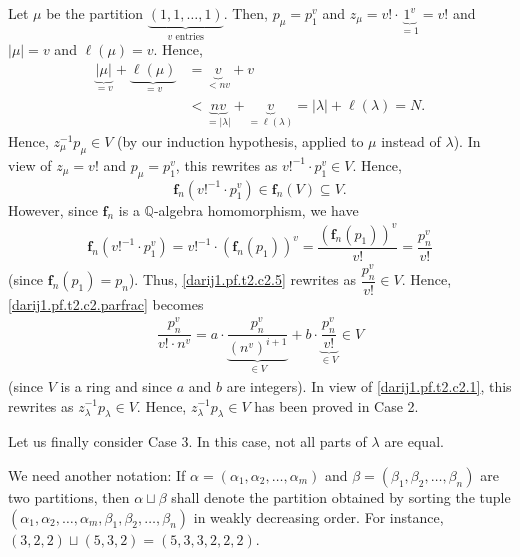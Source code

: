 \documentclass[10pt,a4paper]{article}
\begin{document}
Let $\mu$ be the partition $\underbrace{\left(  1,1,\ldots,1\right)
}_{v\text{ entries}}$. Then, $p_{\mu}=p_{1}^v $ and $z_{\mu}=v!\cdot
\underbrace{1^v }_{=1}=v!$ and $\left\vert \mu\right\vert =v$ and
$\ell\left(  \mu\right)  =v$. Hence,
\begin{align*}
\underbrace{\left\vert \mu\right\vert }_{=v}+\underbrace{\ell\left(
\mu\right)  }_{=v}  & =\underbrace{v}_{< nv} + v\\
& <\underbrace{nv}_{=\left\vert \lambda\right\vert }+\underbrace{v}
_{=\ell\left(  \lambda\right)  }=\left\vert \lambda\right\vert +\ell\left(
\lambda\right)  =N.
\end{align*}
Hence, $z_{\mu}^{-1}p_{\mu}\in V$ (by our induction hypothesis, applied to
$\mu$ instead of $\lambda$). In view of $z_{\mu}=v!$ and $p_{\mu}=p_{1}^v $,
this rewrites as $v!^{-1}\cdot p_{1}^v \in V$. Hence,
\begin{equation}
\mathbf{f}_n\left(  v!^{-1}\cdot p_{1}^v \right)  \in \mathbf{f}
_n\left(  V\right)  \subseteq V.
\label{darij1.pf.t2.c2.5}
\tag{4}
\end{equation}
However, since $\mathbf{f}_n$ is a $\mathbb{Q}$-algebra homomorphism, we
have
\begin{align*}
\mathbf{f}_n\left(  v!^{-1}\cdot p_{1}^v \right)  =v!^{-1}\cdot\left(
\mathbf{f}_n\left(  p_{1}\right)  \right)  ^v =\dfrac{\left(
\mathbf{f}_n\left(  p_{1}\right)  \right)  ^v }{v!}=\dfrac{p_n^v }{v!}
\end{align*}
(since $\mathbf{f}_n\left(  p_{1}\right)  =p_n$). Thus,
\eqref{darij1.pf.t2.c2.5} rewrites as $\dfrac{p_n^v }{v!}\in V$. Hence,
\eqref{darij1.pf.t2.c2.parfrac} becomes
\begin{align*}
\dfrac{p_n^v }{v!\cdot n^v }=a\cdot\underbrace{\dfrac{p_n^v }{\left(
n^v \right)  ^{i+1}}}_{\in V}+b\cdot\underbrace{\dfrac{p_n^v }{v!}}_{\in
V}\in V
\end{align*}
(since $V$ is a ring and since $a$ and $b$ are integers). In view of
\eqref{darij1.pf.t2.c2.1}, this rewrites as $z_{\lambda}^{-1}p_{\lambda}\in
V$. Hence, $z_{\lambda}^{-1}p_{\lambda}\in V$ has been proved in Case 2.




Let us finally consider Case 3. In this case, not all parts of $\lambda$ are equal.




We need another notation: If $\alpha=\left(  \alpha_{1},\alpha_{2}
,\ldots,\alpha_{m}\right)  $ and $\beta=\left(  \beta_{1},\beta_{2}
,\ldots,\beta_n\right)  $ are two partitions, then $\alpha\sqcup\beta$ shall
denote the partition obtained by sorting the tuple $\left(  \alpha_{1}
,\alpha_{2},\ldots,\alpha_{m},\beta_{1},\beta_{2},\ldots,\beta_n\right)  $
in weakly decreasing order. For instance, $\left(  3,2,2\right)  \sqcup\left(
5,3,2\right)  =\left(  5,3,3,2,2,2\right)  $.
\end{document}
